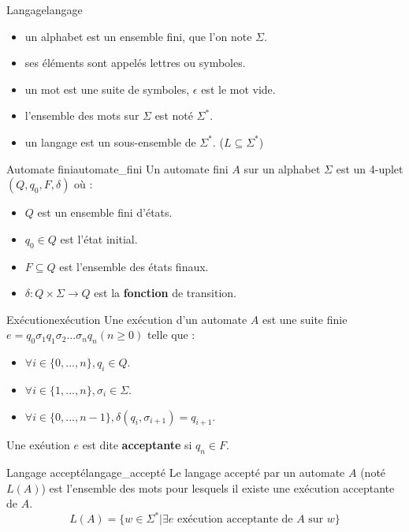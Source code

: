 \begin{definition}{Langage}{langage}
    \begin{itemize}[label=\textbullet]
        \item un alphabet est un ensemble fini, que l'on note $\Sigma$.
        \item ses éléments sont appelés lettres ou symboles.
        \item un mot est une suite de symboles, $\epsilon$ est le mot vide.
        \item l'ensemble des mots sur $\Sigma$ est noté $\Sigma^*$.
        \item un langage est un sous-ensemble de $\Sigma^*$. ($L \subseteq \Sigma^*$)
    \end{itemize}
\end{definition}
\begin{definition}{Automate fini}{automate_fini}
    Un automate fini $A$ sur un alphabet $\Sigma$ est un 4-uplet $(Q, q_0, F, \delta)$ où :
    \begin{itemize}[label=\textbullet]
        \item $Q$ est un ensemble fini d'états.
        \item $q_0 \in Q$ est l'état initial.
        \item $F \subseteq Q$ est l'ensemble des états finaux.
        \item $\delta : Q \times \Sigma \rightarrow Q$ est la \textbf{fonction} de transition.
    \end{itemize}
\end{definition}
\begin{definition}{Exécution}{exécution}
    Une exécution d'un automate $A$ est une suite finie $e = q_0\sigma_1 q_1\sigma_2 ... \sigma_n q_n(n\geq 0)$ telle que :
    \begin{itemize}[label=\textbullet]
        \item $\forall i \in \{0, ..., n\}, q_i \in Q$.
        \item $\forall i \in \{1, ..., n\}, \sigma_i \in \Sigma$.
        \item $\forall i \in \{0, ..., n-1\}, \delta(q_i, \sigma_{i+1}) = q_{i+1}$.
    \end{itemize}
    Une exéution $e$ est dite \textbf{acceptante} si $q_n \in F$.
\end{definition}
\begin{definition}{Langage accepté}{langage_accepté}
    Le langage accepté par un automate $A$ (noté $L(A)$) est l'ensemble des mots pour lesquels il existe une exécution
    acceptante de $A$.
    \begin{equation*}
        L(A) = \{w \in \Sigma^* | \exists e \text{ exécution acceptante de } A \text{ sur } w\}
    \end{equation*}
\end{definition}
